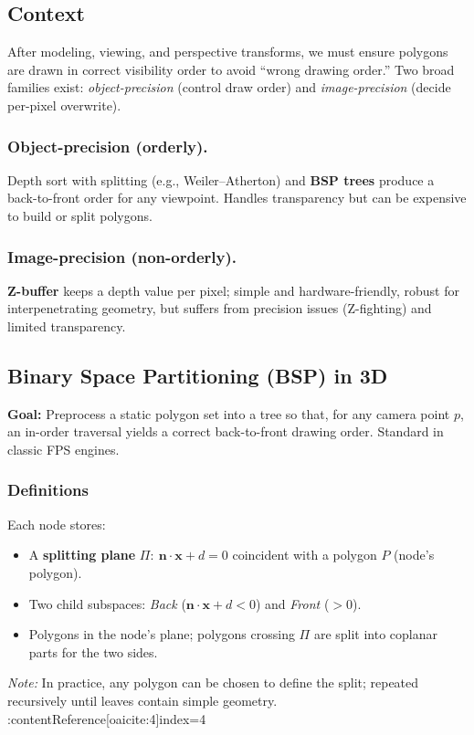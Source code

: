 \documentclass[10pt,twocolumn]{extarticle}
\begin{document}
\subsection*{Context}
After modeling, viewing, and perspective transforms, we must ensure polygons are drawn in correct visibility order to avoid “wrong drawing order.” Two broad families exist: \emph{object-precision} (control draw order) and \emph{image-precision} (decide per-pixel overwrite).
\subsubsection*{Object-precision (orderly).}
Depth sort with splitting (e.g., Weiler–Atherton) and \textbf{BSP trees} produce a back-to-front order for any viewpoint. Handles transparency but can be expensive to build or split polygons. 
\subsubsection*{Image-precision (non-orderly).}
\textbf{Z-buffer} keeps a depth value per pixel; simple and hardware-friendly, robust for interpenetrating geometry, but suffers from precision issues (Z-fighting) and limited transparency. 
\subsection*{Binary Space Partitioning (BSP) in 3D}
\textbf{Goal:} Preprocess a static polygon set into a tree so that, for any camera point $p$, an in-order traversal yields a correct back-to-front drawing order. Standard in classic FPS engines.
\subsubsection*{Definitions}
Each node stores:
\begin{itemize}
  \item A \textbf{splitting plane} $\Pi:\ \mathbf{n}\cdot\mathbf{x}+d=0$ coincident with a polygon $P$ (node’s polygon).
  \item Two child subspaces: \emph{Back} ($\mathbf{n}\cdot\mathbf{x}+d<0$) and \emph{Front} ($>0$).
  \item Polygons in the node’s plane; polygons crossing $\Pi$ are split into coplanar parts for the two sides.
\end{itemize}
\emph{Note:} In practice, any polygon can be chosen to define the split; repeated recursively until leaves contain simple geometry. :contentReference[oaicite:4]{index=4}
\end{document}
